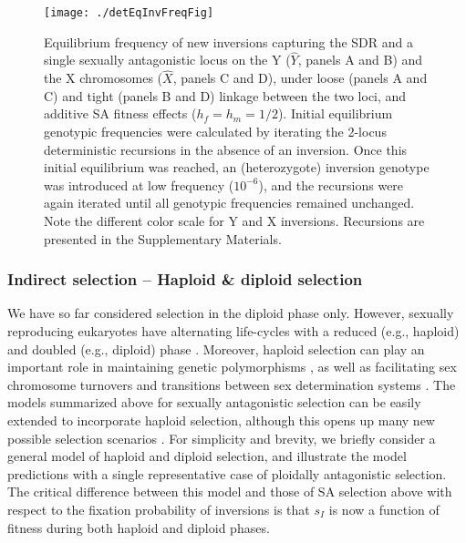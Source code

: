 \documentclass{article}
\begin{document}


 \begin{figure}[!htbp]
 \centering
 \texttt{[image: ./detEqInvFreqFig]}
 \caption{Equilibrium frequency of new inversions capturing the SDR and a single sexually antagonistic locus on the Y ($\hat{Y}$, panels A and B) and the X chromosomes ($\hat{X}$, panels C and D), under loose (panels A and C) and tight (panels B and D) linkage between the two loci, and additive SA fitness effects ($h_f = h_m = 1/2$). Initial equilibrium genotypic frequencies were calculated by iterating the 2-locus deterministic recursions in the absence of an inversion. Once this initial equilibrium was reached, an (heterozygote) inversion genotype was introduced at low frequency ($10^{-6}$), and the recursions were again iterated until all genotypic frequencies remained unchanged. Note the different color scale for Y and X inversions. Recursions are presented in the Supplementary Materials.}
 \label{fig:detInvFreqSA}
 \end{figure}



\subsubsection*{Indirect selection -- Haploid \& diploid selection}

We have so far considered selection in the diploid phase only. However, sexually reproducing eukaryotes have alternating life-cycles with a reduced (e.g., haploid) and doubled (e.g., diploid) phase \citep{Strasburger1894, Roe1975}. Moreover, haploid selection can play an important role in maintaining genetic polymorphisms \citep{ImmlerOtto2011}, as well as facilitating sex chromosome turnovers \citep{OttoScottOsmond2018} and transitions between sex determination systems \citep{MuralidharVeller2018}. The models summarized above for sexually antagonistic selection can be easily extended to incorporate haploid selection, although this opens up many new possible selection scenarios \citep{ImmlerOtto2011, OttoScottOsmond2018}. For simplicity and brevity, we briefly consider a general model of haploid and diploid selection, and illustrate the model predictions with a single representative case of ploidally antagonistic selection. The critical difference between this model and those of SA selection above with respect to the fixation probability of inversions is that $s_I$ is now a function of fitness during both haploid and diploid phases. 
\end{document}

